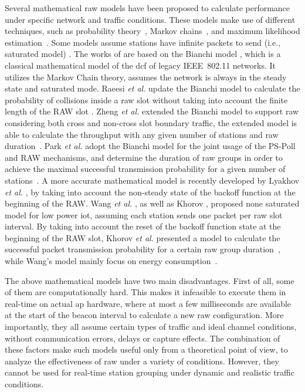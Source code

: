Several mathematical \gls{raw} models have been proposed to calculate  performance under specific network and traffic conditions. These models make use of different techniques, such as probability theory~\cite{Wang2015}, Markov chains~\cite{Raeesi2014a, Khorov2015b,Zheng2014, Evgeny2018, Park2014b}, and maximum likelihood estimation~\cite{Park2014b}. Some models  assume stations have infinite packets to send (i.e., saturated model)  \cite{Raeesi2014a, Zheng2014, Park2014b, Evgeny2018}. The works of \cite{Raeesi2014a, Zheng2014, Park2014b} are based on the Bianchi model \cite{bianchi2000performance}, which is a classical mathematical model of the \gls{dcf} of legacy IEEE~802.11 networks. It utilizes the Markov Chain theory, assumes the network is always in the steady state and saturated mode. Raeesi \textit{et al.}  update the Bianchi model to calculate the probability of collisions inside a \gls{raw} slot without taking into account the finite length of the RAW slot \cite{Raeesi2014a}. Zheng \textit{et al.} extended the Bianchi model to support \gls{raw} considering both cross and non-cross slot boundary traffic, the extended model is able to calculate the throughput with any given number of stations and \gls{raw} duration~\cite{Zheng2014}. Park \textit{et al.} adopt the Bianchi model for the  joint usage of the PS-Poll and RAW mechanisms, and determine the duration of \gls{raw} groups in order to achieve the maximal successful transmission probability for a given number of stations~\cite{Park2014b}. A more accurate mathematical model is recently developed by Lyakhov \textit{et al.} \cite{Evgeny2018}, by taking into account the non-steady state of the backoff function at the beginning of the RAW. Wang \textit{et al.} \cite{Wang2015} , as well as Khorov \cite{Khorov2015b}, proposed none saturated model for low power \gls{iot}, assuming each station sends one packet per \gls{raw} slot interval. By taking into account the reset of the backoff function state at the beginning of the RAW slot, Khorov \textit{et al.} presented a model to calculate the successful packet transmission probability for a certain \gls{raw} group duration~\cite{Khorov2015b}, while Wang's model mainly focus on energy consumption~\cite{Wang2015}. 

The above mathematical models have two main disadvantages. First of all, some of them are computationally hard. This makes it infeasible to execute them in real-time on actual \gls{ap} hardware, where at most a few milliseconds are available at the start of the beacon interval to calculate a new \gls{raw} configuration. More importantly, they all assume certain types of traffic and ideal channel conditions, without communication errors, delays or capture effects. The combination of these factors make such models useful only from a theoretical point of view, to analyze the effectiveness of \gls{raw} under a variety of conditions. However, they cannot be used for real-time station grouping under dynamic and realistic traffic conditions. 

